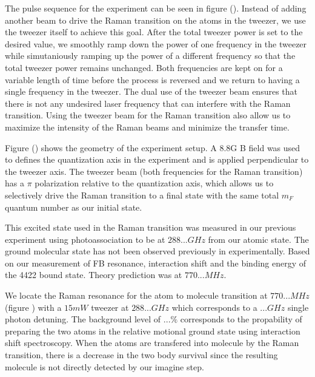 \documentclass[aps,prl,twocolumn,groupedaddress]{revtex4-1}
\newcommand{\todo}[1]{}
\begin{document}
The pulse sequence for the experiment can be seen in figure (). Instead of adding another beam to drive the Raman transition on the atoms in the tweezer, we use the tweezer itself to achieve this goal. After the total tweezer power is set to the desired value, we smoothly ramp down the power of one frequency in the tweezer while simutaniously ramping up the power of a different frequency so that the total tweezer power remains unchanged. Both frequencies are kept on for a variable length of time before the process is reversed and we return to having a single frequency in the tweezer. The dual use of the tweezer beam ensures that there is not any undesired laser frequency that can interfere with the Raman transition. Using the tweezer beam for the Raman transition also allow us to maximize the intensity of the Raman beams and minimize the transfer time.
\todo{clarify coprop of Raman beam?}

Figure () shows the geometry of the experiment setup. A $8.8\mathrm{G}$ B field was used to defines the quantization axis in the experiment and is applied perpendicular to the tweezer axis. The tweezer beam (both frequencies for the Raman transition) has a $\pi$ polarization relative to the quantization axis, which allows us to selectively drive the Raman transition to a final state with the same total $m_F$ quantum number as our initial state.


This excited state used in the Raman transition was measured in our previous experiment using photoassociation to be at $288... GHz$ from our atomic state. The ground molecular state has not been observed previously in experimentally. Based on our measurement of FB resonance, interaction shift and the binding energy of the 4422 bound state. Theory prediction was at $770... MHz$. \todo{more, mention/cite Jeremy}


We locate the Raman resonance for the atom to molecule transition at $770... MHz$ (figure \todo{}) with a $15 mW$ tweezer at $288... GHz$ which corresponds to a $... GHz$ single photon detuning.
The background level of $...\%$ corresponds to the propability of preparing the two atoms in the relative motional ground state using interaction shift spectroscopy. When the atoms are transfered into molecule by the Raman transition, there is a decrease in the two body survival since the resulting molecule is not directly detected by our imagine step.
\todo{more explanation of detection?}
\todo{FWHM of line??}
\end{document}
